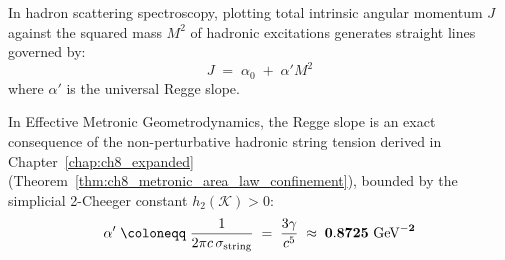 \documentclass[
    12pt,
    a4paper,
    headings=normal,
    twoside=false,
    open=any,
    parskip=half
]{scrbook}
\let\hbar\relax
\begin{document}
In hadron scattering spectroscopy, plotting total intrinsic angular momentum $J$ against the squared mass $M^2$ of hadronic excitations generates straight lines governed by:
\begin{equation}
J \;=\; \alpha_0 \;+\; \alpha' M^2
\label{eq:appA_regge_linear_formula}
\end{equation}
where $\alpha'$ is the universal Regge slope.

In Effective Metronic Geometrodynamics, the Regge slope is an exact consequence of the non-perturbative hadronic string tension derived in Chapter~\ref{chap:ch8_expanded} (Theorem~\ref{thm:ch8_metronic_area_law_confinement}), bounded by the simplicial 2-Cheeger constant $h_2(\mathcal{K}) > 0$:
\begin{equation}
\alpha' \;\coloneqq\; \frac{1}{2\pi \hbar c \, \sigma_{\text{string}}} \;=\; \frac{3\gamma}{c^5} \;\approx\; \mathbf{0.8725 \text{ GeV}^{-2}}
\label{eq:appA_regge_slope_derived}
\end{equation}
\end{document}
